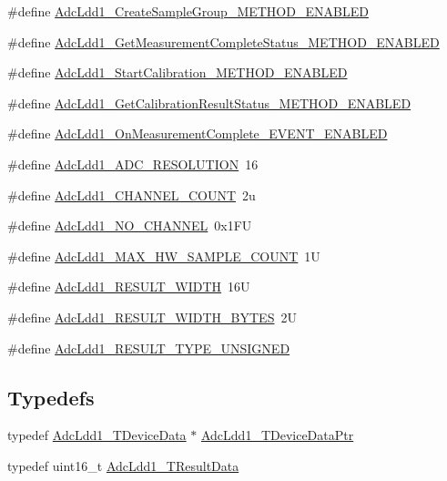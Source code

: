 \begin{DoxyCompactItemize}
\item 
\#define \hyperlink{group___adc_ldd1__module_ga3bb31af9978aad248d5f22efeffdc062}{Adc\+Ldd1\+\_\+\+Create\+Sample\+Group\+\_\+\+M\+E\+T\+H\+O\+D\+\_\+\+E\+N\+A\+B\+L\+ED}
\item 
\#define \hyperlink{group___adc_ldd1__module_gaa5b50f914a3fc9d61298427cfc2e2eba}{Adc\+Ldd1\+\_\+\+Get\+Measurement\+Complete\+Status\+\_\+\+M\+E\+T\+H\+O\+D\+\_\+\+E\+N\+A\+B\+L\+ED}
\item 
\#define \hyperlink{group___adc_ldd1__module_gac899fcf8121917ba023d530d404521fe}{Adc\+Ldd1\+\_\+\+Start\+Calibration\+\_\+\+M\+E\+T\+H\+O\+D\+\_\+\+E\+N\+A\+B\+L\+ED}
\item 
\#define \hyperlink{group___adc_ldd1__module_ga3434a6cf32cd48ee67a1a47fb5f91547}{Adc\+Ldd1\+\_\+\+Get\+Calibration\+Result\+Status\+\_\+\+M\+E\+T\+H\+O\+D\+\_\+\+E\+N\+A\+B\+L\+ED}
\item 
\#define \hyperlink{group___adc_ldd1__module_ga5c863eb6c996c95ecf9e799fd5819e89}{Adc\+Ldd1\+\_\+\+On\+Measurement\+Complete\+\_\+\+E\+V\+E\+N\+T\+\_\+\+E\+N\+A\+B\+L\+ED}
\item 
\#define \hyperlink{group___adc_ldd1__module_gaa8922b556b79ff448ddd20979eda016d}{Adc\+Ldd1\+\_\+\+A\+D\+C\+\_\+\+R\+E\+S\+O\+L\+U\+T\+I\+ON}~16
\item 
\#define \hyperlink{group___adc_ldd1__module_ga1fd3f1eef1222a8b6fd2b9f83736a49a}{Adc\+Ldd1\+\_\+\+C\+H\+A\+N\+N\+E\+L\+\_\+\+C\+O\+U\+NT}~2u
\item 
\#define \hyperlink{group___adc_ldd1__module_ga7d870f5e63fbe60a4c8ed64bb54faebc}{Adc\+Ldd1\+\_\+\+N\+O\+\_\+\+C\+H\+A\+N\+N\+EL}~0x1\+FU
\item 
\#define \hyperlink{group___adc_ldd1__module_ga0b2218fd28c1cf32594ae2bac6a091cb}{Adc\+Ldd1\+\_\+\+M\+A\+X\+\_\+\+H\+W\+\_\+\+S\+A\+M\+P\+L\+E\+\_\+\+C\+O\+U\+NT}~1U
\item 
\#define \hyperlink{group___adc_ldd1__module_ga84f18908164f6c6b8b8ccefa8b01c87b}{Adc\+Ldd1\+\_\+\+R\+E\+S\+U\+L\+T\+\_\+\+W\+I\+D\+TH}~16U
\item 
\#define \hyperlink{group___adc_ldd1__module_gabe7f6957bdc1b4d8a3cb7df4f0e50a88}{Adc\+Ldd1\+\_\+\+R\+E\+S\+U\+L\+T\+\_\+\+W\+I\+D\+T\+H\+\_\+\+B\+Y\+T\+ES}~2U
\item 
\#define \hyperlink{group___adc_ldd1__module_ga57f9b5507ee5e9a1d531867951d1ded9}{Adc\+Ldd1\+\_\+\+R\+E\+S\+U\+L\+T\+\_\+\+T\+Y\+P\+E\+\_\+\+U\+N\+S\+I\+G\+N\+ED}
\end{DoxyCompactItemize}
\subsection*{Typedefs}
\begin{DoxyCompactItemize}
\item 
typedef \hyperlink{struct_adc_ldd1___t_device_data}{Adc\+Ldd1\+\_\+\+T\+Device\+Data} $\ast$ \hyperlink{group___adc_ldd1__module_gabc048953ad953bc16463d49d94832206}{Adc\+Ldd1\+\_\+\+T\+Device\+Data\+Ptr}
\item 
typedef uint16\+\_\+t \hyperlink{group___adc_ldd1__module_ga8eae0d930b3aef7c47506b32a22e4f12}{Adc\+Ldd1\+\_\+\+T\+Result\+Data}
\end{DoxyCompactItemize}
